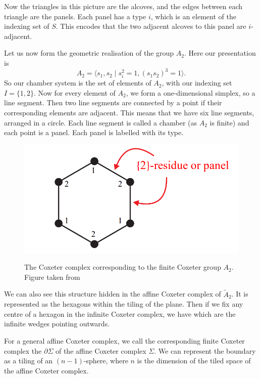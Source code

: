 \documentclass[11pt]{article}
\begin{document}
Now the triangles in this picture are the alcoves, and the edges between each triangle are the panels. Each panel has a type $i$, which is an element of the indexing set of $S$. This encodes that the two adjacent alcoves to this panel are $i$-adjacent. 


Let us now form the geometric realisation of the group $A_2$. Here our presentation is 
\[A_2=\langle s_1,s_2\mid s_i^2=1, (s_1s_2)^3=1\rangle.\]
So our chamber system is the set of elements of $A_2$, with our indexing set $I=\{1,2\}$. Now for every element of $A_2$, we form a one-dimensional simplex, so a line segment. Then two line segments are connected by a point if their corresponding elements are adjacent. This means that we have six line segments, arranged in a circle. Each line segment is called a chamber (as $A_2$ is finite) and each point is a panel. Each panel is labelled with its type.

\begin{figure}[!htbp]
    \begin{center}
        \includegraphics[scale=0.5]{Screenshot 2023-03-21 135437.png}\\
    \end{center}
    \caption{The Coxeter complex corresponding to the finite Coxeter group $A_2$. Figure taken from \cite[p.10]{EVERITT}}
\end{figure}


We can also see this structure hidden in the affine Coxeter complex of $\tilde{A}_2$. It is represented as the hexagons within the tiling of the plane. Then if we fix any centre of a hexagon in the infinite Coxeter complex, we have  which are the infinite wedges pointing outwards. 

For a general affine Coxeter complex, we call the  corresponding finite Coxeter complex the  $\partial\Sigma$ of the affine Coxeter complex $\Sigma$. We can represent the boundary as a tiling of an $(n-1)$-sphere, where $n$ is the dimension of the tiled space of the affine Coxeter complex. 
\end{document}

